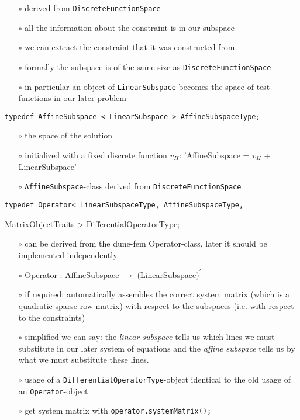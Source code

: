 \documentclass[a4paper,11pt]{article}
\numberwithin{equation}{section}
\begin{document}
\begin{itemize}
\item[$\circ$] derived from {\tt DiscreteFunctionSpace}
\item[$\circ$] all the information about the constraint is in our subspace
\item[$\circ$] we can extract the constraint that it was constructed from
\item[$\circ$] formally the subspace is of the same size as {\tt DiscreteFunctionSpace}
\item[$\circ$] in particular an object of {\tt LinearSubspace} becomes the space of test functions in our later problem
\end{itemize}
{\tt typedef AffineSubspace < LinearSubspace > AffineSubspaceType;}
\begin{itemize}
\item[$\circ$] the space of the solution
\item[$\circ$] initialized with a fixed discrete function $v_H$: 'AffineSubspace = $v_H$ + LinearSubspace'
\item[$\circ$] {\tt AffineSubspace}-class derived from {\tt DiscreteFunctionSpace}
\end{itemize}
{\tt typedef Operator< LinearSubspaceType, AffineSubspaceType,

\hspace{1pt}MatrixObjectTraits > DifferentialOperatorType;}
\begin{itemize}
\item[$\circ$] can be derived from the dune-fem Operator-class, later it should be implemented independently
\item[$\circ$] Operator : AffineSubspace $\rightarrow$ (LinearSubspace$)^{\prime}$
\item[$\circ$] if required: automatically assembles the correct system matrix (which is a quadratic sparse row matrix) with respect to the subspaces (i.e. with respect to the constraints)
\item[$\circ$] simplified we can say: the {\it linear subspace} tells us which lines we must substitute in our later system of equations and the {\it affine subspace} tells us by what we must substitute these lines.
\item[$\circ$] usage of a {\tt DifferentialOperatorType}-object identical to the old usage of an {\tt Operator}-object
\item[$\circ$] get system matrix with {\tt operator.systemMatrix();}
\end{itemize}
\end{document}
